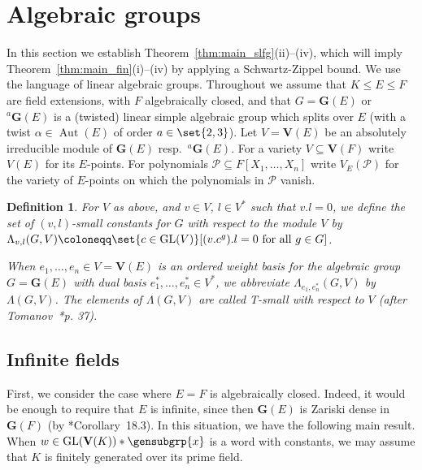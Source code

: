 \documentclass[a4paper,12pt]{amsproc}
\DeclareMathOperator{\GL}{GL}%
\DeclareMathOperator{\Aut}{Aut}
\theoremstyle{plain}
\newtheorem{definition}{Definition}[section]
\theoremstyle{definition}
\begin{document}
\section{Algebraic groups}\label{sec:alg_grps}

In this section we establish Theorem~\ref{thm:main_slfg}(ii)--(iv), which will imply Theorem~\ref{thm:main_fin}(i)--(iv) by applying a Schwartz-Zippel bound. We use the language of linear algebraic groups. Throughout we assume that $K \leq E \leq F$ are field extensions, with $F$ algebraically closed, and that $G=\mathbf{G}(E)$ or ${}^a\mathbf{G}(E)$ is a (twisted) linear simple algebraic group which splits over $E$ (with a twist $\alpha\in\Aut(E)$ of order $a\in\set{2,3}$). Let $V=\mathbf{V}(E)$ be an absolutely irreducible module of $\mathbf{G}(E)$ resp.\ ${}^a\mathbf{G}(E)$. For a variety $V\subseteq\mathbf{V}(F)$ write $V(E)$ for its $E$-points. For polynomials $\mathcal{P}\subseteq F[X_1,\ldots,X_n]$ write $V_E(\mathcal{P})$ for the variety of $E$-points on which the polynomials in $\mathcal{P}$ vanish.

\begin{definition}
For $V$ as above, and $v\in V$, $l\in V^\ast$ such that $v.l=0$, 
we define the set of $(v,l)$-\emph{small} constants for $G$ with respect to the module $V$ by $\Lambda_{v,l}(G,V)\coloneqq\set{c\in\GL(V)}[(v.c^g).l=0 \text{ for all }g\in G]$.

When $e_1,\ldots,e_n\in V=\mathbf{V}(E)$ is an ordered weight basis for the algebraic group $G=\mathbf{G}(E)$ with dual basis $e_1^\ast,\ldots,e_n^\ast\in V^\ast$, we abbreviate $\Lambda_{e_1,e_n^\ast}(G,V)$ by $\Lambda(G,V)$. The elements of $\Lambda(G,V)$ are called \emph{T-small} with respect to $V$ (after Tomanov~\cite{tomanov1985generalized}*{p. 37}).
\end{definition}

\subsection{Infinite fields}

First, we consider the case where $E=F$ is algebraically closed. Indeed, it would be enough to require that $E$ is infinite, since then $\mathbf{G}(E)$ is Zariski dense in $\mathbf{G}(F)$ (by \cite{borel2012linear}*{Corollary~18.3}). In this situation, we have the following main result. When $w\in\GL(\mathbf{V}(K))\ast\gensubgrp{x}$ is a word with constants, we may assume that $K$ is finitely generated over its prime field.
\end{document}
